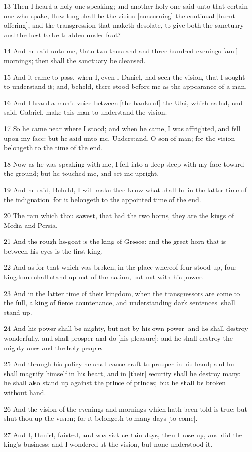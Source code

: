 \par 13 Then I heard a holy one speaking; and another holy one said unto that certain one who spake, How long shall be the vision [concerning] the continual [burnt-offering], and the transgression that maketh desolate, to give both the sanctuary and the host to be trodden under foot?
\par 14 And he said unto me, Unto two thousand and three hundred evenings [and] mornings; then shall the sanctuary be cleansed.
\par 15 And it came to pass, when I, even I Daniel, had seen the vision, that I sought to understand it; and, behold, there stood before me as the appearance of a man.
\par 16 And I heard a man's voice between [the banks of] the Ulai, which called, and said, Gabriel, make this man to understand the vision.
\par 17 So he came near where I stood; and when he came, I was affrighted, and fell upon my face: but he said unto me, Understand, O son of man; for the vision belongeth to the time of the end.
\par 18 Now as he was speaking with me, I fell into a deep sleep with my face toward the ground; but he touched me, and set me upright.
\par 19 And he said, Behold, I will make thee know what shall be in the latter time of the indignation; for it belongeth to the appointed time of the end.
\par 20 The ram which thou sawest, that had the two horns, they are the kings of Media and Persia.
\par 21 And the rough he-goat is the king of Greece: and the great horn that is between his eyes is the first king.
\par 22 And as for that which was broken, in the place whereof four stood up, four kingdoms shall stand up out of the nation, but not with his power.
\par 23 And in the latter time of their kingdom, when the transgressors are come to the full, a king of fierce countenance, and understanding dark sentences, shall stand up.
\par 24 And his power shall be mighty, but not by his own power; and he shall destroy wonderfully, and shall prosper and do [his pleasure]; and he shall destroy the mighty ones and the holy people.
\par 25 And through his policy he shall cause craft to prosper in his hand; and he shall magnify himself in his heart, and in [their] security shall he destroy many: he shall also stand up against the prince of princes; but he shall be broken without hand.
\par 26 And the vision of the evenings and mornings which hath been told is true: but shut thou up the vision; for it belongeth to many days [to come].
\par 27 And I, Daniel, fainted, and was sick certain days; then I rose up, and did the king's business: and I wondered at the vision, but none understood it.

